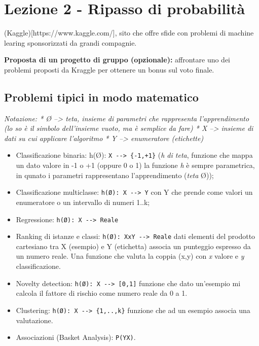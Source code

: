 \section{Lezione 2 - Ripasso di
probabilità}\label{lezione-2---ripasso-di-probabilituxe0}

(Kaggle){[}https://www.kaggle.com/{]}, sito che offre sfide con problemi
di machine learing sponsorizzati da grandi compagnie.

\textbf{Proposta di un progetto di gruppo (opzionale):} affrontare uno
dei problemi proposti da Kraggle per ottenere un bonus sul voto finale.

\subsection{Problemi tipici in modo
matematico}\label{problemi-tipici-in-modo-matematico}

\emph{Notazione: * Ø --\textgreater{} teta, insieme di parametri che
rappresenta l'apprendimento (lo so è il simbolo dell'insieme vuoto, ma è
semplice da fare) * X --\textgreater{} insieme di dati su cui applicare
l'algoritmo * Y --\textgreater{} enumeratore (etichette)}

\begin{itemize}
\tightlist
\item
  Classificazione binaria: h(Ø):
  \texttt{X\ -\/-\textgreater{}\ \{-1,+1\}} (\emph{h di teta}, funzione
  che mappa un dato valore in -1 o +1 (oppure 0 o 1) la funzione
  \emph{h} è sempre parametrica, in qunato i parametri rappresentano
  l'apprendimento (\emph{teta} Ø));
\item
  Classificazione multiclasse: \texttt{h(Ø):\ X\ -\/-\textgreater{}\ Y}
  con Y che prende come valori un enumeratore o un intervallo di numeri
  1..k;
\item
  Regressione: \texttt{h(Ø):\ X\ -\/-\textgreater{}\ Reale}
\item
  Ranking di istanze e classi:
  \texttt{h(Ø):\ XxY\ -\/-\textgreater{}\ Reale} dati elementi del
  prodotto cartesiano tra X (esempio) e Y (etichetta) associa un
  punteggio espresso da un numero reale. Una funzione che valuta la
  coppia (x,y) con \emph{x} valore e \emph{y} classificazione.
\item
  Novelty detection: \texttt{h(Ø):\ X\ -\/-\textgreater{}\ {[}0,1{]}}
  funzione che dato un'esempio mi calcola il fattore di rischio come
  numero reale da 0 a 1.
\item
  Clustering: \texttt{h(Ø):\ X\ -\/-\textgreater{}\ \{1,..,k\}} funzione
  che ad un esempio associa una valutazione.
\item
  Associazioni (Basket Analysis): \texttt{P(Y\textbar{}X)}.
\end{itemize}

